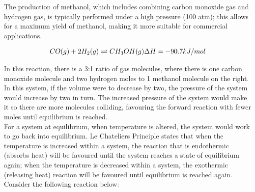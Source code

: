 The production of methanol, which includes combining carbon monoxide gas and hydrogen gas, is typically performed under a high pressure (100 atm); this allows for a maximum yield of methanol, making it more suitable for commercial applications. 

\begin{figure}[htp]
    \centering
    \[
       CO (g) + 2H_{2} (g) \rightleftharpoons CH_{3}OH(g) \\
    	\Delta H = -90.7 kJ/mol
    \]
    \caption{}
    \label{fig:enter-label}
\end{figure}

In this reaction, there is a 3:1 ratio of gas molecules, where there is one carbon monoxide molecule and two hydrogen moles to 1 methanol molecule on the right. In this system, if the volume were to decrease by two, the pressure of the system would increase by two in turn. The increased pressure of the system would make it so there are more molecules colliding, favouring the forward reaction with fewer moles until equilibrium is reached. \\

For a system at equilibrium, when temperature is altered, the system would work to go back into equilibrium. Le Chateliers Principle states that when the temperature is increased within a system, the reaction that is endothermic (absorbs heat) will be favoured until the system reaches a state of equilibrium again; when the temperature is decreased within a system, the exothermic (releasing heat) reaction will be favoured until equilibrium is reached again. \\

Consider the following reaction below: 

